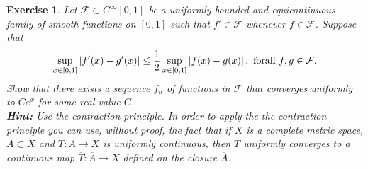 \documentclass[11pt]{article}
\newtheorem{exercise}{Exercise}[section]
\theoremstyle{definition}
\numberwithin{equation}{subsection}
\begin{document}
\begin{exercise}{\rm *}
Let $\mathcal{F} \subset C^\infty[0,1]$ be a uniformly bounded and equicontinuous family of smooth functions on $[0,1]$ such that $f' \in \mathcal{F}$ whenever $f \in \mathcal{F}$. Suppose that 
\begin{align*}
    \sup_{x\in[0,1]} \left|f'(x) - g'(x)\right| \leq \frac{1}{2} \sup_{x\in[0,1]} \left|f(x) - g(x)\right|, \,\, {\rm for all}\,\, f, g \in \mathcal{F}.
\end{align*}
Show that there exists a sequence $f_n$ of functions in $\mathcal{F}$ that converges uniformly to $Ce^x$ for some real value $C$.\\
{\bf Hint:} Use the contraction principle. In order to apply the the contraction principle you can use, without proof, the fact that if $X$ is a complete metric space, $A \subset X$ and $T: A \to X$ is uniformly continuous, then $T$ uniformly converges to a continuous map $\overline{T}: \overline{A} \to X$ defined on the closure $\overline{A}$.
\end{exercise}
\end{document}
